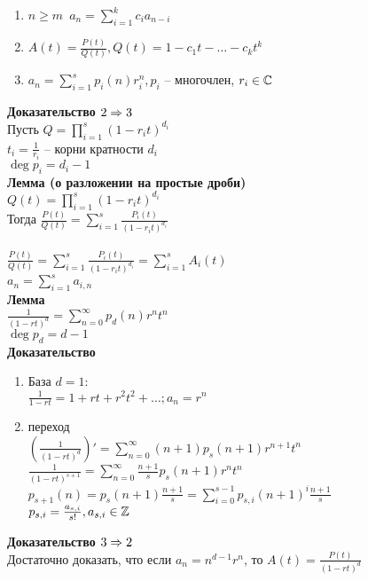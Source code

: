 \documentclass[12pt]{article}
\begin{document}
\begin{enumerate}
    \item $n \geq m$\ $a_n = \sum_{i=1}^k c_i a_{n-i}$
    \item $A(t) = \frac{P(t)}{Q(t)}, Q(t) = 1-c_1t-\ldots-c_kt^k$
    \item $a_n = \sum_{i=1}^s p_i(n) r_i^n, p_i$ -- многочлен, $r_i \in \mathbb{C}$
\end{enumerate}
\textbf{Доказательство $2 \Rightarrow 3$}\\
Пусть $Q = \prod_{i=1}^{s}(1-r_it)^{d_i}$\\
$t_i=\frac{1}{r_i}$ -- корни кратности $d_i$\\
$\deg p_i = d_i-1$\\
\textbf{Лемма (о разложении на простые дроби)}\\
$Q(t) = \prod_{i=1}^{s} (1-r_it)^{d_i}$\\
Тогда $\frac{P(t)}{Q(t)} = \sum_{i=1}^s \frac{P_i(t)}{(1-r_it)^{d_i}}$\\\\
$\frac{P(t)}{Q(t)} = \sum_{i=1}^s \frac{P_i(t)}{(1-r_it)^{d_i}} = \sum_{i=1}^s A_i(t)$\\
$a_n = \sum_{i=1}^s a_{i,n}$\\
\textbf{Лемма}\\
$\frac1{(1-rt)^d} = \sum_{n=0}^\infty p_d(n)r^nt^n$\\
$\deg p_d = d-1$\\
\textbf{Доказательство}
\begin{enumerate}
    \item База $d = 1$:\\
    $\frac1{1-rt} = 1 + rt + r^2t^2 + \ldots; a_n=r^n$
    \item переход\\
    $(\frac1{(1-rt)^d})' = \sum_{n=0}^\infty (n+1)p_s(n+1)r^{n+1}t^n$\\
    $\frac1{(1-rt)^{s+1}} = \sum_{n=0}^\infty \frac{n+1}s p_s(n+1)r^nt^n$\\
    $p_{s+1}(n)=p_s(n+1)\frac{n+1}{s} = \sum_{i=0}^{s-1} p_{s,i}(n+1)^i \frac{n+1}{s}$\\
    $p_{s,i} = \frac{a_{s,i}}{s!}, a_{s,i} \in \mathbb{Z}$
\end{enumerate}
\textbf{Доказательство $3\Rightarrow 2$}\\
Достаточно доказать, что если $a_n = n^{d-1}r^n$, то $A(t) = \frac{P(t)}{(1-rt)^d}$\\
\end{document}

